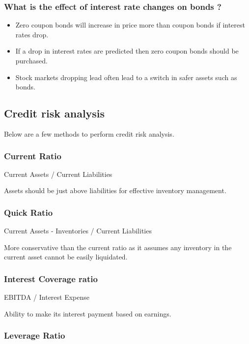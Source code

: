 \documentclass[11pt]{scrartcl} %
\begin{document}
\subsubsection{What is the effect of interest rate changes on bonds ?}

\begin{itemize}
	\item Zero coupon bonds will increase in price more than coupon bonds if interest rates drop.
	\item If a drop in interest rates are predicted then zero coupon bonds should be purchased.
	\item Stock markets dropping lead often lead to a switch in safer assets such as bonds.
\end{itemize}

\subsection{Credit risk analysis}

Below are a few methods to perform credit risk analysis.

\subsubsection{Current Ratio}

Current Assets / Current Liabilities

Assets should be just above liabilities for effective inventory management.

\subsubsection{Quick Ratio}

Current Assets - Inventories / Current Liabilities

More conservative than the current ratio as it assumes any inventory in the current asset cannot be easily liquidated.

\subsubsection{Interest Coverage ratio}

EBITDA / Interest Expense

Ability to make its interest payment based on earnings.

\subsubsection{Leverage Ratio}
\end{document}
